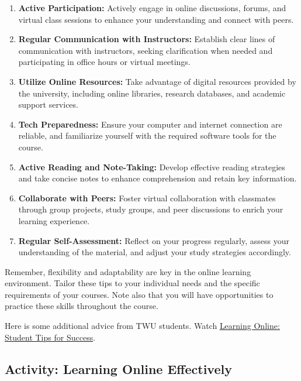 \documentclass[
]{book}
\theoremstyle{definition}
\theoremstyle{definition}
\theoremstyle{definition}
\theoremstyle{definition}
\theoremstyle{remark}
\begin{document}
\begin{enumerate}
\def\labelenumi{\arabic{enumi}.}
\item
  \textbf{Active Participation:} Actively engage in online discussions, forums, and virtual class sessions to enhance your understanding and connect with peers.
\item
  \textbf{Regular Communication with Instructors:} Establish clear lines of communication with instructors, seeking clarification when needed and participating in office hours or virtual meetings.
\item
  \textbf{Utilize Online Resources:} Take advantage of digital resources provided by the university, including online libraries, research databases, and academic support services.
\item
  \textbf{Tech Preparedness:} Ensure your computer and internet connection are reliable, and familiarize yourself with the required software tools for the course.
\item
  \textbf{Active Reading and Note-Taking:} Develop effective reading strategies and take concise notes to enhance comprehension and retain key information.
\item
  \textbf{Collaborate with Peers:} Foster virtual collaboration with classmates through group projects, study groups, and peer discussions to enrich your learning experience.
\item
  \textbf{Regular Self-Assessment:} Reflect on your progress regularly, assess your understanding of the material, and adjust your study strategies accordingly.
\end{enumerate}

Remember, flexibility and adaptability are key in the online learning environment. Tailor these tips to your individual needs and the specific requirements of your courses. Note also that you will have opportunities to practice these skills throughout the course.

Here is some additional advice from TWU students. Watch \href{https://vimeo.com/493206161}{Learning Online: Student Tips for Success}.

\hypertarget{activity-learning-online-effectively}{%
\subsection*{Activity: Learning Online Effectively}\label{activity-learning-online-effectively}}
\end{document}

